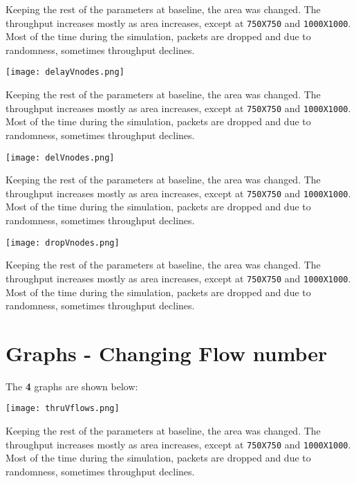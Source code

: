 \documentclass{article}
\begin{document}
Keeping the rest of the parameters at baseline, the area was changed. The throughput increases mostly as area increases, except at \texttt{750X750} and \texttt{1000X1000}. Most of the time during the simulation, packets are dropped and due to randomness, sometimes throughput declines.

\begin{center}
    \texttt{[image: delayVnodes.png]}
\end{center}

Keeping the rest of the parameters at baseline, the area was changed. The throughput increases mostly as area increases, except at \texttt{750X750} and \texttt{1000X1000}. Most of the time during the simulation, packets are dropped and due to randomness, sometimes throughput declines.

\begin{center}
    \texttt{[image: delVnodes.png]}
\end{center}

Keeping the rest of the parameters at baseline, the area was changed. The throughput increases mostly as area increases, except at \texttt{750X750} and \texttt{1000X1000}. Most of the time during the simulation, packets are dropped and due to randomness, sometimes throughput declines.

\begin{center}
    \texttt{[image: dropVnodes.png]}
\end{center}

Keeping the rest of the parameters at baseline, the area was changed. The throughput increases mostly as area increases, except at \texttt{750X750} and \texttt{1000X1000}. Most of the time during the simulation, packets are dropped and due to randomness, sometimes throughput declines.

\section{Graphs - Changing Flow number}
The \textbf{4} graphs are shown below:

\begin{center}
    \texttt{[image: thruVflows.png]}
\end{center}

Keeping the rest of the parameters at baseline, the area was changed. The throughput increases mostly as area increases, except at \texttt{750X750} and \texttt{1000X1000}. Most of the time during the simulation, packets are dropped and due to randomness, sometimes throughput declines.
\end{document}
